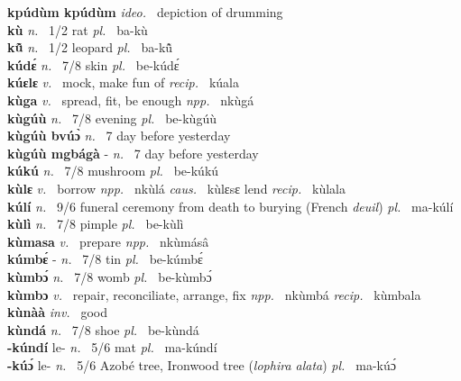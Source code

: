 {\bfseries kpúdùm kpúdùm}  {\itshape ideo.~} depiction of drumming    \\ 
{\bfseries kù}  {\itshape n.~} 1/2 rat {\itshape pl.~} ba-kù    \\ 
{\bfseries kũ̂}  {\itshape n.~} 1/2 leopard {\itshape pl.~} ba-kũ̂    \\ 
{\bfseries kúdɛ́}  {\itshape n.~} 7/8 skin {\itshape pl.~} be-kúdɛ́    \\ 
{\bfseries kúɛlɛ}  {\itshape v.~} mock, make fun of   {\itshape recip.~} kúala  \\ 
{\bfseries kùga}  {\itshape v.~} spread, fit, be enough   {\itshape npp.~} nkùgá  \\ 
{\bfseries kùgúù}  {\itshape n.~} 7/8 evening {\itshape pl.~} be-kùgúù    \\ 
{\bfseries kùgúù bvúɔ̀}  {\itshape n.~} 7 day before yesterday    \\ 
{\bfseries kùgúù mgbágà} - {\itshape n.~} 7 day before yesterday    \\ 
{\bfseries kúkú}  {\itshape n.~} 7/8 mushroom {\itshape pl.~} be-kúkú    \\ 
{\bfseries kùlɛ}  {\itshape v.~} borrow   {\itshape npp.~} nkùlá {\itshape caus.~} kùlɛsɛ lend {\itshape recip.~} kùlala  \\ 
{\bfseries kúlí}  {\itshape n.~} 9/6 funeral ceremony from death to burying (French {\itshape deuil}) {\itshape pl.~} ma-kúlí    \\ 
{\bfseries kùlì}  {\itshape n.~} 7/8 pimple {\itshape pl.~} be-kùlì    \\ 
{\bfseries kùmasa}  {\itshape v.~} prepare   {\itshape npp.~} nkùmásâ  \\ 
{\bfseries kúmbɛ́} - {\itshape n.~} 7/8 tin {\itshape pl.~} be-kúmbɛ́    \\ 
{\bfseries kùmbɔ́}  {\itshape n.~} 7/8 womb {\itshape pl.~} be-kùmbɔ́    \\ 
{\bfseries kùmbɔ}  {\itshape v.~} repair, reconciliate, arrange, fix   {\itshape npp.~} nkùmbá {\itshape recip.~} kùmbala  \\ 
{\bfseries kùnàà}  {\itshape inv.~} good    \\ 
{\bfseries kùndá}  {\itshape n.~} 7/8 shoe {\itshape pl.~} be-kùndá    \\ 
{\bfseries -kúndí} le- {\itshape n.~} 5/6 mat {\itshape pl.~} ma-kúndí    \\ 
{\bfseries -kúɔ́} le- {\itshape n.~} 5/6 Azobé tree, Ironwood tree ({\itshape lophira alata}) {\itshape pl.~} ma-kúɔ́    \\ 
